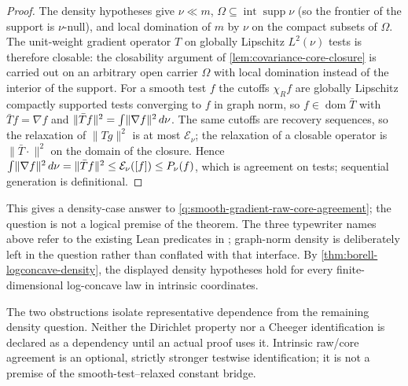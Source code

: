 \begin{proof}
  \leanok
  The density hypotheses give $\nu\ll m$, $\Omega\subseteq\operatorname{int}\operatorname{supp}\nu$
  (so the frontier of the support is $\nu$-null), and local domination of $m$ by $\nu$ on the
  compact subsets of $\Omega$.  The unit-weight gradient operator $T$ on globally Lipschitz
  $L^2(\nu)$ tests is therefore closable: the closability argument of
  \cref{lem:covariance-core-closure} is carried out on an arbitrary open carrier $\Omega$ with
  local domination instead of the interior of the support.  For a smooth test $f$ the cutoffs
  $\chi_R f$ are globally Lipschitz compactly supported tests converging to $f$ in graph norm,
  so $f\in\operatorname{dom}\bar T$ with $\bar Tf=\nabla f$ and
  $\|\bar Tf\|^2=\int\lVert\nabla f\rVert^2\,d\nu$.  The same cutoffs are recovery sequences,
  so the relaxation of $\|Tg\|^2$ is at most $\mathcal E_\nu$; the relaxation of a closable
  operator is $\|\bar T\cdot\|^2$ on the domain of the closure.  Hence
  $\int\lVert\nabla f\rVert^2\,d\nu=\|\bar Tf\|^2\le\mathcal E_\nu([f])\le P_\nu(f)$, which is
  agreement on tests; sequential generation is definitional.
\end{proof}

This gives a density-case answer to \cref{q:smooth-gradient-raw-core-agreement}; the question is
not a logical premise of the theorem.  The three typewriter names above refer to the existing Lean
predicates in ; graph-norm density is deliberately
left in the question rather than conflated with that interface.  By
\cref{thm:borell-logconcave-density}, the displayed density hypotheses hold for every
finite-dimensional log-concave law in intrinsic coordinates.

The two obstructions isolate representative dependence from the remaining density question.
Neither the Dirichlet property nor a Cheeger identification is declared as a dependency until an
actual proof uses it.  Intrinsic raw/core agreement is an optional, strictly stronger testwise
identification; it is not a premise of the smooth-test--relaxed constant bridge.

